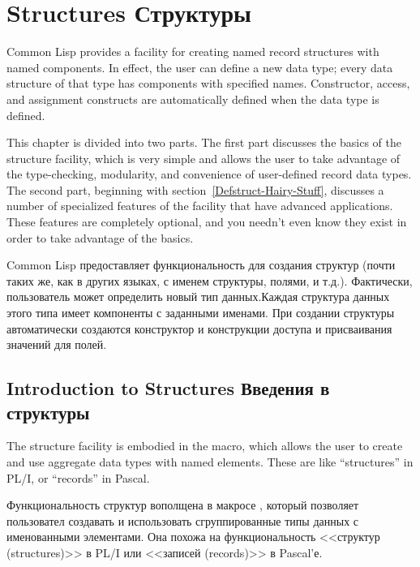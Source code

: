 
\clearpage\def\pagestatus{FINAL PROOF}

\chapter{Structures Структуры}

Common Lisp provides a facility for creating named record structures
with named components.  In effect, the user can define a new data type;
every data structure of that type has components with specified names.
Constructor, access, and assignment constructs are automatically
defined when the data type is defined.

This chapter is divided into two parts.  The first part discusses
the basics of the structure facility, which is very simple and allows
the user to take advantage of the type-checking, modularity, and
convenience of user-defined record data types.  The second part,
beginning with section~\ref{Defstruct-Hairy-Stuff},
discusses a number of specialized features of the facility that
have advanced applications.  These features are completely optional,
and you needn't even know they exist in order to take
advantage of the basics.

Common Lisp предоставляет функциональность для создания структур (почти таких
же, как в других языках, с именем структуры, полями, и т.д.). Фактически,
пользователь может определить новый тип данных.Каждая структура данных
этого типа имеет компоненты с заданными именами.
При создании структуры автоматически создаются конструктор и конструкции доступа
и присваивания значений для полей.

\section{Introduction to Structures Введения в структуры}
\label{DEFSTRUCT-INTRO-SECTION}

The structure facility is embodied in the  macro,
which allows the user to create and use
aggregate data types with named elements.  These are like
``structures'' in {PL/I}, or ``records'' in Pascal.

Функциональность структур вополщена в макросе , который позволяет
пользовател создавать и использовать сгруппированные типы данных с именованными
элементами. Она похожа на функциональность <<структур (structures)>> в {PL/I}
или <<записей (records)>> в Pascal'е.

